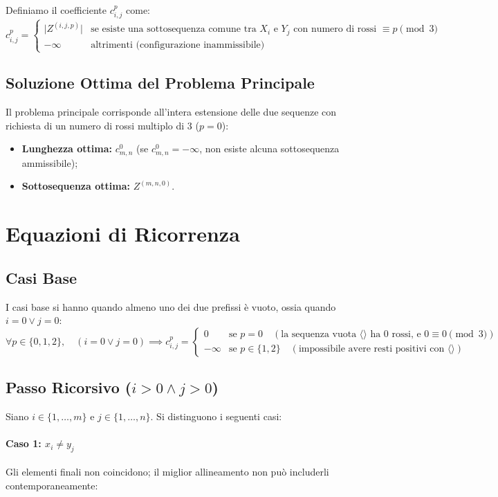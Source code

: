 Definiamo il coefficiente $c_{i,j}^p$ come:
$$c_{i,j}^p = \begin{cases} \vert{}Z^{(i,j,p)}\vert{} & \text{se esiste una sottosequenza comune tra } X_i \text{ e } Y_j \text{ con numero di rossi } \equiv p \pmod 3 \\ -\infty & \text{altrimenti (configurazione inammissibile)} \end{cases}$$\subsection{Soluzione Ottima del Problema Principale}
Il problema principale corrisponde all'intera estensione delle due sequenze con richiesta di un numero di rossi multiplo di 3 ($p = 0$):
\begin{itemize}
\item \textbf{Lunghezza ottima:} $c_{m,n}^0$ (se $c_{m,n}^0 = -\infty$, non esiste alcuna sottosequenza ammissibile);
\item \textbf{Sottosequenza ottima:} $Z^{(m,n,0)}$.
\end{itemize}\section{Equazioni di Ricorrenza}\subsection{Casi Base}
I casi base si hanno quando almeno uno dei due prefissi è vuoto, ossia quando $i = 0 \lor j = 0$:
$$\forall p \in \{0, 1, 2\}, \quad (i = 0 \lor j = 0) \implies c_{i,j}^p = \begin{cases} 0 & \text{se } p = 0 \quad (\text{la sequenza vuota } \langle \rangle \text{ ha } 0 \text{ rossi, e } 0 \equiv 0 \pmod 3) \\ -\infty & \text{se } p \in \{1, 2\} \quad (\text{impossibile avere resti positivi con } \langle \rangle) \end{cases}$$\subsection{Passo Ricorsivo ($i > 0 \land j > 0$)}
Siano $i \in \{1, \dots, m\}$ e $j \in \{1, \dots, n\}$. Si distinguono i seguenti casi:\paragraph{Caso 1: $x_i \neq y_j$}
Gli elementi finali non coincidono; il miglior allineamento non può includerli contemporaneamente:
